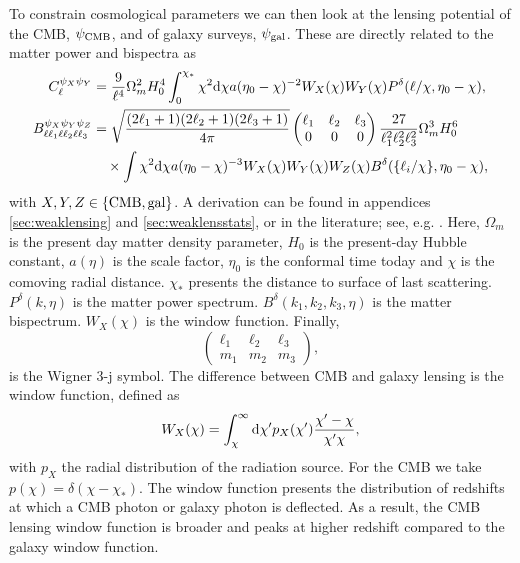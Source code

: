 \documentclass[11pt]{article} %
\DeclareRobustCommand{\d}{\ifmmode\text{d}\else d\fi}
\DeclareRobustCommand{\CMB}{\ifmmode\text{CMB}\else d\fi}
\DeclareRobustCommand{\gal}{\ifmmode\text{gal}\else d\fi}
\begin{document}
To constrain cosmological parameters we can then look at the lensing potential of the CMB, $\psi_\CMB$, and of galaxy surveys, $\psi_\gal$. These are directly related to the matter power and bispectra as
\begin{align}%
    C^{\psi_X\psi_Y}_\ell
    & = \frac{9}{\ell^4}\Omega_m^2H_0^4\int_0^{\chi_*} \chi^2 \d\chi a(\eta_0-\chi)^{-2}W_X(\chi)W_Y(\chi)P^\delta(\ell/\chi,\eta_0-\chi), \label{eq:lensingpower spectrum}\\
    B^{\psi_X\psi_Y\psi_Z}_{\ell\ell_1\ell\ell_2\ell\ell_3} &= \sqrt{\frac{(2\ell_1 + 1)(2\ell_2 + 1)(2\ell_3 + 1)}{4\pi}} \begin{pmatrix} \ell_1 & \ell_2 & \ell_3 \\ 0 & 0 & 0 \end{pmatrix} \frac{27}{\ell_1^2\ell_2^2\ell_3^2}\Omega_m^3H_0^6 \notag\\
    & \quad \times \int \chi^2\d \chi a(\eta_0-\chi)^{-3}W_X(\chi)W_Y(\chi)W_Z(\chi)  B^\delta(\{\ell_i/\chi\}, \eta_0-\chi), \label{eq:lensingbispectrum}
\end{align}
with $X, Y, Z \in \{\CMB, \gal\}$. A derivation can be found in appendices \ref{sec:weaklensing} and \ref{sec:weaklensstats}, or in the literature; see, e.g. \cite{Bartelmann2001}. Here, $\Omega_m$ is the present day matter density parameter, $H_0$ is the present-day Hubble constant, $a(\eta)$ is the scale factor, $\eta_0$ is the conformal time today and $\chi$ is the comoving radial distance. $\chi_*$ presents the distance to surface of last scattering. $P^\delta(k, \eta)$ is the matter power spectrum. $B^\delta(k_1, k_2, k_3, \eta)$ is the matter bispectrum. $W_X(\chi)$ is the window function. Finally,
$$
\begin{pmatrix}
    \ell_1&\ell_2&\ell_3 \\ m_1 & m_2 & m_3
\end{pmatrix},
$$ 
is the Wigner 3-j symbol. The difference between CMB and galaxy lensing is the window function, defined as
\begin{equation}
    W_X(\chi) = \int_\chi^{\infty}\d\chi' p_X(\chi')\frac{\chi'-\chi}{\chi'\chi},
    \label{eq:windowfuncdef}
\end{equation}
with $p_X$ the radial distribution of the radiation source. For the CMB we take $p(\chi) = \delta(\chi - \chi_*)$. The window function presents the distribution of redshifts at which a CMB photon or galaxy photon is deflected. As a result, the CMB lensing window function is broader and peaks at higher redshift compared to the galaxy window function.
\end{document}
